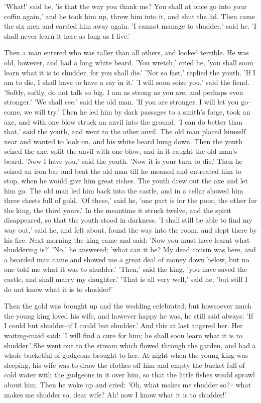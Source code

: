 \documentclass[12pt]{book}
\begin{document}
'What!' said he, 'is that the way you thank me? You shall at once go
into your coffin again,' and he took him up, threw him into it, and
shut the lid. Then came the six men and carried him away again. 'I
cannot manage to shudder,' said he. 'I shall never learn it here as
long as I live.'

Then a man entered who was taller than all others, and looked
terrible. He was old, however, and had a long white beard. 'You
wretch,' cried he, 'you shall soon learn what it is to shudder, for
you shall die.' 'Not so fast,' replied the youth. 'If I am to die, I
shall have to have a say in it.' 'I will soon seize you,' said the
fiend. 'Softly, softly, do not talk so big. I am as strong as you are,
and perhaps even stronger.' 'We shall see,' said the old man. 'If you
are stronger, I will let you go--come, we will try.' Then he led him
by dark passages to a smith's forge, took an axe, and with one blow
struck an anvil into the ground. 'I can do better than that,' said the
youth, and went to the other anvil. The old man placed himself near
and wanted to look on, and his white beard hung down. Then the youth
seized the axe, split the anvil with one blow, and in it caught the
old man's beard. 'Now I have you,' said the youth. 'Now it is your
turn to die.' Then he seized an iron bar and beat the old man till he
moaned and entreated him to stop, when he would give him great riches.
The youth drew out the axe and let him go. The old man led him back
into the castle, and in a cellar showed him three chests full of gold.
'Of these,' said he, 'one part is for the poor, the other for the
king, the third yours.' In the meantime it struck twelve, and the
spirit disappeared, so that the youth stood in darkness. 'I shall
still be able to find my way out,' said he, and felt about, found the
way into the room, and slept there by his fire. Next morning the king
came and said: 'Now you must have learnt what shuddering is?' 'No,' he
answered; 'what can it be? My dead cousin was here, and a bearded man
came and showed me a great deal of money down below, but no one told
me what it was to shudder.' 'Then,' said the king, 'you have saved the
castle, and shall marry my daughter.' 'That is all very well,' said
he, 'but still I do not know what it is to shudder!'

Then the gold was brought up and the wedding celebrated; but howsoever
much the young king loved his wife, and however happy he was, he still
said always: 'If I could but shudder--if I could but shudder.' And
this at last angered her. Her waiting-maid said: 'I will find a cure
for him; he shall soon learn what it is to shudder.' She went out to
the stream which flowed through the garden, and had a whole bucketful
of gudgeons brought to her. At night when the young king was sleeping,
his wife was to draw the clothes off him and empty the bucket full of
cold water with the gudgeons in it over him, so that the little fishes
would sprawl about him. Then he woke up and cried: 'Oh, what makes me
shudder so?-- what makes me shudder so, dear wife? Ah! now I know what
it is to shudder!'
\end{document}

